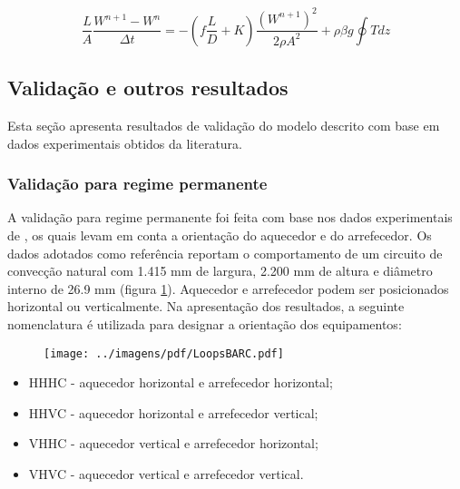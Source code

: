 \documentclass[a4paper,portuguese,10pt]{article}
\begin{document}
\begin{equation}
  \frac{L}{A}\frac{W^{n+1}-W^n}{\Delta t} = -\left(f\frac{L}{D}+K\right)\frac{(W^{n+1})^2}{2\rho A^2} + \rho\beta g\oint Tdz
\label{eq_m_tran_disc}
\end{equation}

\subsection{Validação e outros resultados\label{sec_resultados}}

Esta seção apresenta resultados de validação do modelo descrito com base em dados experimentais obtidos da literatura. %

\subsubsection{Validação para regime permanente}

A validação para regime permanente foi feita com base nos dados experimentais de \citet{VIJAYAN07}, os quais levam em conta a orientação do aquecedor e do arrefecedor. Os dados adotados como referência reportam o comportamento de um circuito de convecção natural com 1.415 mm de largura, 2.200 mm de altura e diâmetro interno de 26.9 mm (figura \ref{fig_loopsbarc}). Aquecedor e arrefecedor podem ser posicionados horizontal ou verticalmente. Na apresentação dos resultados, a seguinte nomenclatura é utilizada para designar a orientação dos equipamentos:

\begin{figure}
  \begin{center}
    \texttt{[image: ../imagens/pdf/LoopsBARC.pdf]}
    \label{fig_loopsbarc}
  \end{center}
\end{figure}

\begin{itemize}
  \item HHHC - aquecedor horizontal e arrefecedor horizontal;
  \item HHVC - aquecedor horizontal e arrefecedor vertical;
  \item VHHC - aquecedor vertical e arrefecedor horizontal;
  \item VHVC - aquecedor vertical e arrefecedor vertical.
\end{itemize}
\end{document}
